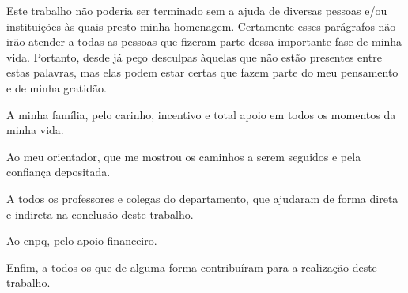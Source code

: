 
\begin{agradecimentos}%
Este trabalho não poderia ser terminado sem a ajuda de diversas pessoas e/ou instituições às quais presto minha homenagem. Certamente esses parágrafos não irão atender a todas as pessoas que fizeram parte dessa importante fase de minha vida. Portanto, desde já peço desculpas àquelas que não estão presentes entre estas palavras, mas elas podem estar certas que fazem parte do meu pensamento e de minha gratidão.

A minha família, pelo carinho, incentivo e total apoio em todos os momentos da minha vida.

Ao meu orientador, que me mostrou os caminhos a serem seguidos e pela confiança depositada.

A todos os professores e colegas do departamento, que ajudaram de forma direta e indireta na conclusão deste trabalho.

Ao \gls{cnpq}, pelo apoio financeiro.

Enfim, a todos os que de alguma forma contribuíram para a realização deste trabalho.
\end{agradecimentos}
